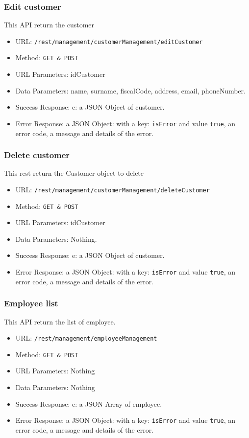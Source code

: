 \subsubsection*{Edit customer}
This API return the customer
\begin{itemize}
    \item URL: \texttt{/rest/management/customerManagement/editCustomer
}
    \item Method: \texttt{{GET \& POST}}
    \item URL Parameters: idCustomer
    \item Data Parameters: name, surname, fiscalCode, address, email, phoneNumber.
    \item Success Response: e: a JSON Object of customer.
    \item Error Response: a JSON Object: with a key: \texttt{isError}  and value \texttt{true}, an error code, a message and details of the error.
\end{itemize}
\subsubsection*{Delete customer}
This rest return the Customer object to delete
\begin{itemize}
    \item URL: \texttt{/rest/management/customerManagement/deleteCustomer
}
    \item Method: \texttt{{GET \& POST}}
    \item URL Parameters: idCustomer
    \item Data Parameters: Nothing.
    \item Success Response: e: a JSON Object of customer.
    \item Error Response: a JSON Object: with a key: \texttt{isError}  and value \texttt{true}, an error code, a message and details of the error.
\end{itemize}

\subsubsection*{Employee list}
This API return the list of employee. 

\begin{itemize}
    \item URL: \texttt{/rest/management/employeeManagement}
    \item Method: \texttt{{GET \& POST}}
    \item URL Parameters: Nothing
    \item Data Parameters: Nothing
    \item Success Response: e: a JSON Array of employee.
    \item Error Response: a JSON Object: with a key: \texttt{isError}  and value \texttt{true}, an error code, a message and details of the error.
\end{itemize}
